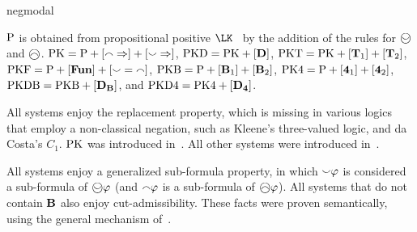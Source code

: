 \begin{entry}{negmodal}
\begin{clarifications}
 ${\rm {P}}$ is obtained from propositional positive $\LK$~
 by the addition of the rules for $\wsmile$ and $\wfrown$.
 {${\rm {PK}}={\rm {P}}+[{\smallfrown}\Rightarrow]+[{\smallsmile}\Rightarrow]$,}
 {${\rm {PKD}}={\rm {PK}}+[{\bf D}]$,}
 {${\rm {PKT}}={\rm {PK}}+[{\bf T}_{1}]+[{\bf T}_{2}]$,}
 {${\rm {PKF}}={\rm {P}}+[{\bf Fun}]+[{\smallsmile}={\smallfrown}]$,}
 {${\rm {PKB}}={\rm {P}}+[{\bf B}_{1}]+[{\bf B}_{2}]$,}
 {${\rm {PK4}}={\rm {P}}+[{\bf 4}_{1}]+[{\bf 4}_{2}]$,}
 {${\rm {PKDB}}={\rm {PKB}}+[{\bf D}_{{\bf B}}]$,} and
 {${\rm {PKD4}}={\rm {PK4}}+[{\bf D}_{{\bf 4}}]$.}
\end{clarifications}

\begin{history}
  All systems enjoy the replacement property, which is missing in various logics
  that employ a non-classical negation, such as Kleene's three-valued logic, and
  da Costa's $C_{1}$. ${\rm {PK}}$ was introduced in~\cite{dod:mar:ENTCS2013}. All
  other systems were introduced in~\cite{lahav_it_2016,Lahav2017}.
\end{history}

\begin{technicalities}
  All systems enjoy a generalized sub-formula property, in which ${\smallsmile}\varphi$
  is considered a sub-formula of $\wsmile\varphi$ (and ${\smallfrown}\varphi$ is a
  sub-formula of $\wfrown\varphi$).  All systems that do not contain ${\bf B}$ also
  enjoy cut-admissibility.  These facts were proven semantically, using the
  general mechanism of~\cite{Lahav:2013:USF:2555591.2528930}.
\end{technicalities}

\end{entry}
